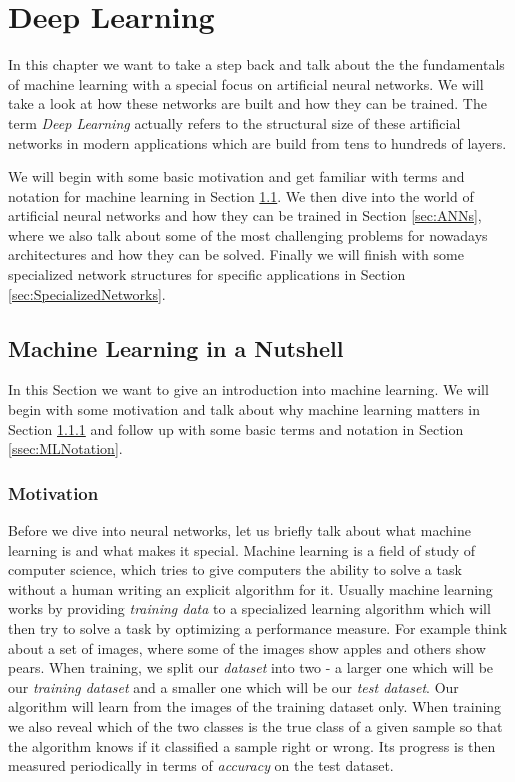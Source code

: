 \chapter{Deep Learning} \label{chp:DeepLearning}
In this chapter we want to take a step back and talk about the the fundamentals of machine learning with a special focus on artificial neural networks. We will take a look at how these networks are built and how they can be trained. The term \textit{Deep Learning} actually refers to the structural size of these artificial networks in modern applications which are build from tens to hundreds of layers.

We will begin with some basic motivation and get familiar with terms and notation for machine learning in Section \ref{ssec:MLNutshell}. We then dive into the world of artificial neural networks and how they can be trained in Section \ref{sec:ANNs}, where we also talk about some of the most challenging problems for nowadays architectures and how they can be solved. Finally we will finish with some specialized network structures for specific applications in Section \ref{sec:SpecializedNetworks}.

\section{Machine Learning in a Nutshell} \label{ssec:MLNutshell}
In this Section we want to give an introduction into machine learning. We will begin with some motivation and talk about why machine learning matters in Section \ref{ssec:MLMotivation} and follow up with some basic terms and notation in Section \ref{ssec:MLNotation}.

\subsection{Motivation} \label{ssec:MLMotivation}
Before we dive into neural networks, let us briefly talk about what machine learning is and what makes it special. Machine learning is a field of study of computer science, which tries to give computers the ability to solve a task without a human writing an explicit algorithm for it. Usually machine learning works by providing \textit{training data} to a specialized learning algorithm which will then try to solve a task by optimizing a performance measure. For example think about a set of images, where some of the images show apples and others show pears. When training, we split our \textit{dataset} into two - a larger one which will be our \textit{training dataset} and a smaller one which will be our \textit{test dataset}. Our algorithm will learn from the images of the training dataset only. When training we also reveal which of the two classes is the true class of a given sample so that the algorithm knows if it classified a sample right or wrong. Its progress is then measured periodically in terms of \textit{accuracy} on the test dataset.

